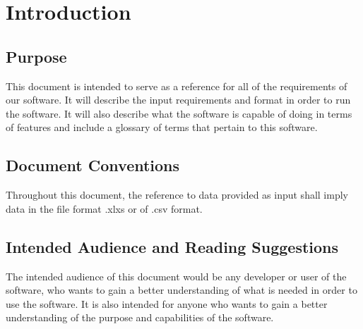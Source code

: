 \section{Introduction}

\subsection{Purpose}

This document is intended to serve as a reference for all of the requirements of our software. It will describe the input requirements and format in order to run the software. It will also describe what the software is capable of doing in terms of features and include a glossary of terms that pertain to this software.

\subsection{Document Conventions}

Throughout this document, the reference to data provided as input shall imply data in the file format .xlxs or of .csv format.

\subsection{Intended Audience and Reading Suggestions}

The intended audience of this document would be any developer or user of the software, who wants to gain a better understanding of what is needed in order to use the software. It is also intended for anyone who wants to gain a better understanding of the purpose and capabilities of the software.

